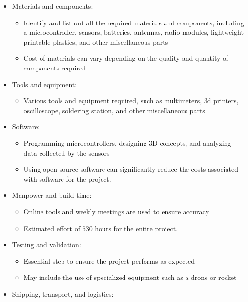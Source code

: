 \begin{itemize}[leftmargin=1cm, itemindent=0.25cm, noitemsep, topsep=0pt, label=$\bullet$]
\item Materials and components:
\begin{itemize}[label=, noitemsep, topsep=1pt]
\item Identify and list out all the required materials and components, including a microcontroller, sensors, batteries, antennas, radio modules, lightweight printable plastics, and other miscellaneous parts
\item Cost of materials can vary depending on the quality and quantity of components required
\end{itemize}
\item Tools and equipment:
\begin{itemize}[label=, noitemsep, topsep=1pt]
\item Various tools and equipment required, such as multimeters, 3d printers, oscilloscope, soldering station, and other miscellaneous parts
\end{itemize}
\item Software:
\begin{itemize}[label=, noitemsep, topsep=1pt]
\item Programming microcontrollers, designing 3D concepts, and analyzing data collected by the sensors
\item Using open-source software can significantly reduce the costs associated with software for the project.
\end{itemize}
\item Manpower and build time:
\begin{itemize}[label=, noitemsep, topsep=1pt]
\item Online tools and weekly meetings are used to ensure accuracy
\item Estimated effort of 630 hours for the entire project.
\end{itemize}
\item Testing and validation:
\begin{itemize}[label=, noitemsep, topsep=1pt]
\item Essential step to ensure the project performs as expected
\item May include the use of specialized equipment such as a drone or rocket
\end{itemize}
\item Shipping, transport, and logistics:
\begin{itemize}[label=, noitemsep, topsep=1pt]

\end{itemize}
\end{itemize}
